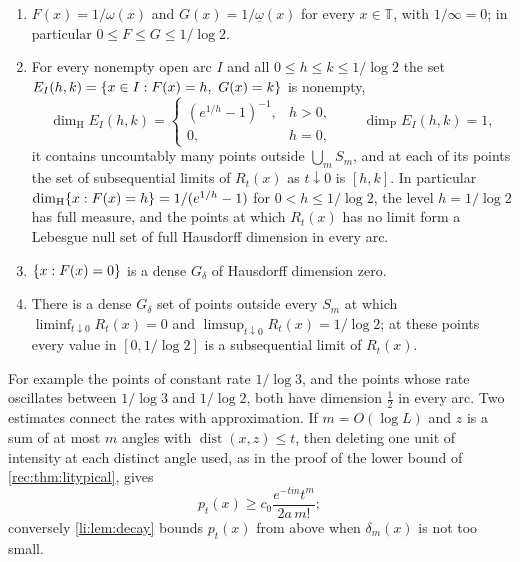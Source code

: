 \begin{theorem}\label{li:thm:spectrum}
\begin{enumerate}[label=\textup{(\roman*)}]
\item $F(x)=1/\omega(x)$ and $G(x)=1/\underline\omega(x)$ for every $x\in\mathbb T$, with $1/\infty=0$; in particular
$0\le F\le G\le1/\log2$.
\item For every nonempty open arc $I$ and all $0\le h\le k\le1/\log2$ the set
$E_I(h,k)=\set{x\in I:F(x)=h,\ G(x)=k}$ is nonempty,
\[
 \dim_{\mathrm H}E_I(h,k)=\begin{cases}(e^{1/h}-1)^{-1},&h>0,\\0,&h=0,\end{cases}\qquad\dim_{\mathrm P}E_I(h,k)=1,
\]
it contains uncountably many points outside $\bigcup_mS_m$, and at each of its points the set of
subsequential limits of $R_t(x)$ as $t\downarrow0$ is $[h,k]$. In particular
$\dim_{\mathrm H}\{x:F(x)=h\}=1/(e^{1/h}-1)$ for $0<h\le1/\log2$, the level $h=1/\log2$ has full measure, and the
points at which $R_t(x)$ has no limit form a Lebesgue null set of full Hausdorff dimension in every arc.
\item $\{x:F(x)=0\}$ is a dense $G_\delta$ of Hausdorff dimension zero.
\item There is a dense $G_\delta$ set of points outside every $S_m$ at which $\liminf_{t\downarrow0}R_t(x)=0$ and
$\limsup_{t\downarrow0}R_t(x)=1/\log2$; at these points every value in $[0,1/\log2]$ is a subsequential limit of $R_t(x)$.
\end{enumerate}
\end{theorem}

For example the points of constant rate $1/\log3$, and the points whose rate oscillates between $1/\log3$
and $1/\log2$, both have dimension $\frac12$ in every arc. Two estimates connect the rates with
approximation. If $m=O(\log L)$ and $z$ is a sum of at most $m$ angles with $\operatorname{dist}(x,z)\le t$, then
deleting one unit of intensity at each distinct angle used, as in the proof of the lower bound of
\cref{rec:thm:litypical}, gives
\begin{equation}\label{lih:eq:near}
 p_t(x)\ge c_0\frac{e^{-tm}t^m}{2a\,m!};
\end{equation}
conversely \cref{li:lem:decay} bounds $p_t(x)$ from above when $\delta_m(x)$ is not too small.

